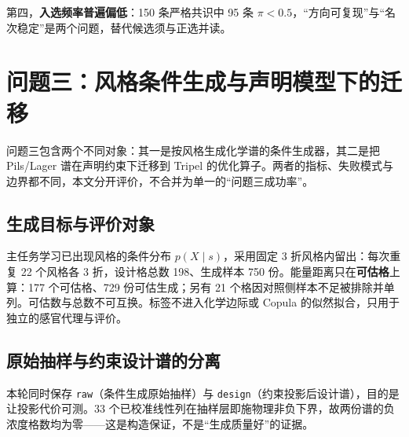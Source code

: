 \documentclass[11pt,a4paper]{article}
\begin{document}
第四，\textbf{入选频率普遍偏低}：150 条严格共识中 95 条
\(\pi<0.5\)，``方向可复现''与``名次稳定''是两个问题，替代候选须与正选并读。

\section{问题三：风格条件生成与声明模型下的迁移}\label{ux95eeux9898ux4e09ux98ceux683cux6761ux4ef6ux751fux6210ux4e0eux58f0ux660eux6a21ux578bux4e0bux7684ux8fc1ux79fb}

问题三包含两个不同对象：其一是按风格生成化学谱的条件生成器，其二是把
Pils/Lager 谱在声明约束下迁移到 Tripel
的优化算子。两者的指标、失败模式与边界都不同，本文分开评价，不合并为单一的``问题三成功率''。

\subsection{生成目标与评价对象}\label{ux751fux6210ux76eeux6807ux4e0eux8bc4ux4ef7ux5bf9ux8c61}

主任务学习已出现风格的条件分布 \(p(X\mid s)\)，采用固定 3
折风格内留出：每次重复 22 个风格各 3 折，设计格总数 198、生成样本 750
份。能量距离只在\textbf{可估格}上算：177 个可估格、729 份可估生成；另有
21
个格因对照侧样本不足被排除并单列。可估数与总数不可互换。标签不进入化学边际或
Copula 的似然拟合，只用于独立的感官代理与评价。

\subsection{原始抽样与约束设计谱的分离}\label{ux539fux59cbux62bdux6837ux4e0eux7ea6ux675fux8bbeux8ba1ux8c31ux7684ux5206ux79bb}

本轮同时保存 \texttt{raw}（条件生成原始抽样）与
\texttt{design}（约束投影后设计谱），目的是让投影代价可测。33
个已校准线性列在抽样层即施物理非负下界，故两份谱的负浓度格数均为零------这是构造保证，不是``生成质量好''的证据。
\end{document}

